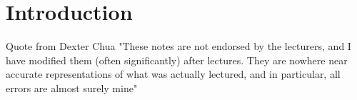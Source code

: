 \newpage
\section{Introduction \label{sec:intro}}
Quote from Dexter Chua "These notes are not endorsed by the lecturers, and I have modified them (often
significantly) after lectures. They are nowhere near accurate representations of what
was actually lectured, and in particular, all errors are almost surely mine"


